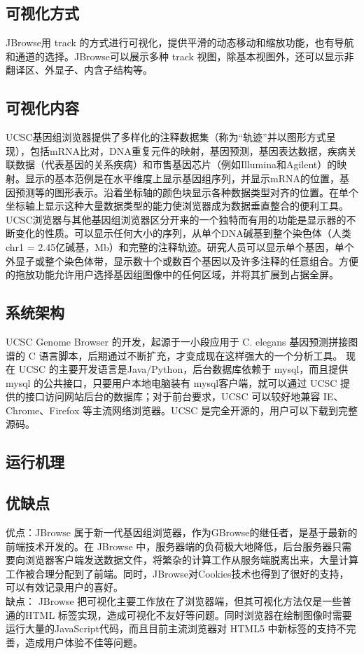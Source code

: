 		\subsection{可视化方式}
		JBrowse用 track 的方式进行可视化，提供平滑的动态移动和缩放功能，也有导航和通道的选择。JBrowse可以展示多种 track 视图，除基本视图外，还可以显示非翻译区、外显子、内含子结构等。
		
		\subsection{可视化内容}
		UCSC基因组浏览器提供了多样化的注释数据集（称为“轨迹”并以图形方式呈现），包括mRNA比对，DNA重复元件的映射，基因预测，基因表达数据，疾病关联数据（代表基因的关系疾病）和市售基因芯片（例如Illumina和Agilent）的映射。显示的基本范例是在水平维度上显示基因组序列，并显示mRNA的位置，基因预测等的图形表示。沿着坐标轴的颜色块显示各种数据类型对齐的位置。在单个坐标轴上显示这种大量数据类型的能力使浏览器成为数据垂直整合的便利工具。
		UCSC浏览器与其他基因组浏览器区分开来的一个独特而有用的功能是显示器的不断变化的性质。可以显示任何大小的序列，从单个DNA碱基到整个染色体（人类chr1 = 2.45亿碱基，Mb）和完整的注释轨迹。研究人员可以显示单个基因，单个外显子或整个染色体带，显示数十个或数百个基因以及许多注释的任意组合。方便的拖放功能允许用户选择基因组图像中的任何区域，并将其扩展到占据全屏。
		
		\subsection{系统架构}
		UCSC Genome Browser 的开发，起源于一小段应用于 C. elegans 基因预测拼接图谱的 C 语言脚本，后期通过不断扩充，才变成现在这样强大的一个分析工具。 现在 UCSC 的主要开发语言是Java/Python，后台数据库依赖于 mysql，而且提供mysql 的公共接口，只要用户本地电脑装有 mysql客户端，就可以通过 UCSC 提供的接口访问网站后台的数据库；对于前台要求，UCSC 可以较好地兼容 IE、Chrome、Firefox 等主流网络浏览器。UCSC 是完全开源的，用户可以下载到完整源码。
		\subsection{运行机理}
		\subsection{优缺点}
		优点：JBrowse 属于新一代基因组浏览器，作为GBrowse的继任者，是基于最新的前端技术开发的。在 JBrowse 中，服务器端的负荷极大地降低，后台服务器只需要向浏览器客户端发送数据文件，将繁杂的计算工作从服务端脱离出来，大量计算工作被合理分配到了前端。同时，JBrowse对Cookies技术也得到了很好的支持，可以有效记录用户的喜好。\\
		\indent 缺点： JBrowse 把可视化主要工作放在了浏览器端，但其可视化方法仅是一些普通的HTML 标签实现，造成可视化不友好等问题。同时浏览器在绘制图像时需要运行大量的JavaScript代码，而且目前主流浏览器对 HTML5 中新标签的支持不完善，造成用户体验不佳等问题。